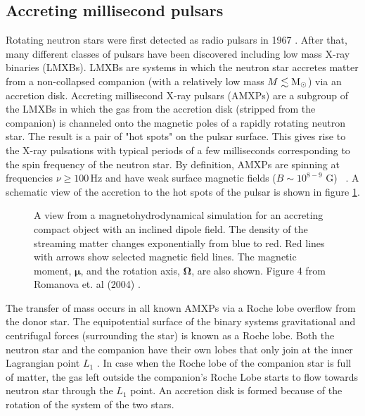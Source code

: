 \documentclass{wihuri}
\def\msun{{\rm M_{\odot}}}
\newcommand{\bmath}[1]{\boldsymbol{#1}}
\begin{document}


\subsection{Accreting millisecond pulsars}






Rotating neutron stars were first detected as radio pulsars in 1967 \cite{gold68}. %
After that, many different classes of pulsars have been discovered including low mass X-ray binaries (LMXBs). LMXBs are systems in which the neutron star accretes matter from a non-collapsed companion (with a relatively low mass $M \lesssim \msun$) via an accretion disk. Accreting millisecond X-ray pulsars (AMXPs) are a subgroup of the LMXBs in which the gas from the accretion disk (stripped from the companion) is channeled onto the magnetic poles of a rapidly rotating neutron star. The result is a pair of "hot spots" on the pulsar surface.  This gives rise to the X-ray pulsations with typical periods of a few milliseconds corresponding to the spin frequency of the neutron star. By definition, AMXPs are spinning at frequencies $\nu \ge 100 \, \mathrm{Hz}$ and have weak surface magnetic fields ($B \sim 10^{8-9}$ G) ~\cite{patruno}. A schematic view of the accretion to the hot spots of the pulsar is shown in figure \ref{fig:shcematic}.


\begin{figure}
\centerline{} 
\caption{A view from a magnetohydrodynamical simulation for an accreting compact object with an inclined dipole field. The density of the streaming matter changes exponentially from blue to red. Red lines with arrows show selected magnetic field lines. The magnetic moment, $\bmath{\mu}$, and the rotation axis, $\bmath{\Omega}$, are also shown. Figure 4 from Romanova et. al (2004) \cite{romanova}.} 
\label{fig:shcematic}
\end{figure}

The transfer of mass occurs in all known AMXPs via a Roche lobe overflow from the donor star. The equipotential surface of the binary systems gravitational and centrifugal forces (surrounding the star) is known as a Roche lobe. Both the neutron star and the companion have their own lobes that only join at the inner Lagrangian point $L_{1}$ \cite{frank85}. %
In case when the Roche lobe of the companion star is full of matter, the gas left outside the companion's Roche Lobe starts to flow towards neutron star through the  $L_{1}$ point. An accretion disk is formed because of the rotation of the system of the two stars.
 
\end{document}
